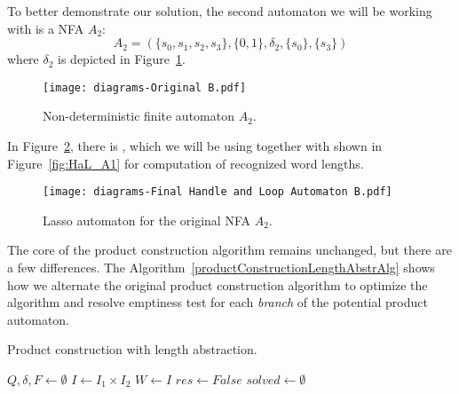 To better demonstrate our solution, the second automaton we will be working with is a NFA $A_2$:
$$ A_2 = (\{s_0, s_1, s_2, s_3\}, \{0, 1\}, \delta_2, \{s_0\}, \{s_3\}) $$
where $\delta_2$ is depicted in Figure~\ref{fig:NFA_A2_orig}.

\begin{figure}[ht]
    \centering
	\texttt{[image: diagrams-Original B.pdf]}
	\caption{Non-deterministic finite automaton $A_2$.}
	\label{fig:NFA_A2_orig}
\end{figure}

In Figure~\ref{fig:HaL_A2}, there is , which we will be using together with  shown in Figure~\ref{fig:HaL_A1} for computation of recognized word lengths.

\begin{figure}[ht]
    \centering
	\texttt{[image: diagrams-Final Handle and Loop Automaton B.pdf]}
	\caption{Lasso automaton  for the original NFA $A_2$.}
	\label{fig:HaL_A2}
\end{figure}

The core of the product construction algorithm remains unchanged, but there are a few differences. The Algorithm~\ref{productConstructionLengthAbstrAlg} shows how we alternate the original product construction algorithm to optimize the algorithm and resolve emptiness test for each \emph{branch} of the potential product automaton.

\begin{algorithm}
\caption{Product construction with length abstraction.}\label{productConstructionLengthAbstrAlg}
\DontPrintSemicolon
{}
\BlankLine
$Q, \delta, F \gets \emptyset$ \;
$I \gets I_1 \times I_2$ \;
$W \gets I$ \;\label{work_set}
$res \gets False$ \;\label{sat}
$solved \gets \emptyset$ \;\label{solved}
\end{algorithm}

